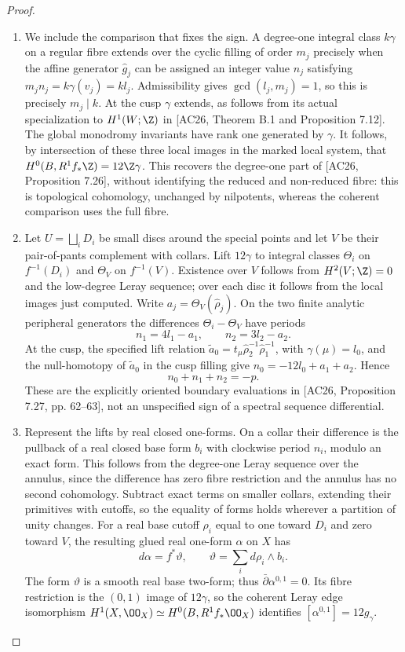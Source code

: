 \begin{proof}
\begin{enumerate}[label=\arabic*.,leftmargin=*]
\item We include the comparison that fixes the sign.  A degree-one integral
class $k\gamma$ on a regular fibre extends over the cyclic filling of
order $m_j$ precisely when the affine generator $\hat g_j$ can be
assigned an integer value $n_j$ satisfying
$m_j n_j=k\gamma(v_j)=kl_j$.  Admissibility gives
$\gcd(l_j,m_j)=1$, so this is precisely $m_j\mid k$.
At the cusp $\gamma$ extends, as follows from its actual specialization
to $H^1(W;\Z)$ in [AC26, Theorem B.1 and Proposition 7.12].
The global monodromy invariants have rank one generated by $\gamma$.
It follows, by intersection of these three local images in the marked
local system, that
$H^0(B,R^1f_*\Z)=12\Z\gamma$.  This recovers the degree-one
part of [AC26, Proposition 7.26], without identifying the reduced and
non-reduced fibre: this is topological cohomology, unchanged by
nilpotents, whereas the coherent comparison uses the full fibre.

\item Let $U=\bigsqcup_iD_i$ be small discs around the special points and
let $V$ be their pair-of-pants complement with collars.  Lift
$12\gamma$ to integral classes $\Theta_i$ on $f^{-1}(D_i)$ and
$\Theta_V$ on $f^{-1}(V)$.  Existence over $V$ follows from
$H^2(V;\Z)=0$ and the low-degree Leray sequence; over each disc it
follows from the local images just computed.  Write
$a_j=\Theta_V(\hat\rho_j)$.  On the two finite analytic peripheral generators
the differences $\Theta_i-\Theta_V$ have periods
\[
n_1=4l_1-a_1,\qquad n_2=3l_2-a_2.
\]
At the cusp, the specified lift relation
$\widetilde a_0=t_\mu\hat\rho_2^{-1}\hat\rho_1^{-1}$,
with $\gamma(\mu)=l_0$, and the null-homotopy of
$\widetilde a_0$ in the cusp filling give
$n_0=-12l_0+a_1+a_2$.  Hence
\begin{equation}\label{inv:eq:C-collar-sum}
n_0+n_1+n_2=-p.
\end{equation}
These are the explicitly oriented boundary evaluations in [AC26,
Proposition 7.27, pp. 62--63], not an unspecified sign of a spectral
sequence differential.

\item Represent the lifts by real closed one-forms.  On a collar their
difference is the pullback of a real closed base form $b_i$ with
clockwise period $n_i$, modulo an exact form.  This follows from the
degree-one Leray sequence over the annulus, since the difference has
zero fibre restriction and the annulus has no second cohomology.
Subtract exact terms on smaller collars, extending their primitives
with cutoffs, so the equality of forms holds wherever a partition of
unity changes.  For a real base cutoff $\rho_i$ equal to one toward
$D_i$ and zero toward $V$, the resulting glued real one-form $\alpha$
on $X$ has
\[
d\alpha=f^*\vartheta,\qquad
\vartheta=\sum_i d\rho_i\wedge b_i.
\]
The form $\vartheta$ is a smooth real base two-form; thus
$\bar\partial\alpha^{0,1}=0$.  Its fibre restriction is the
$(0,1)$ image of $12\gamma$, so the coherent Leray edge isomorphism
$H^1(X,\OO_X)\simeq H^0(B,R^1f_*\OO_X)$ identifies
$[\alpha^{0,1}]=12g_\gamma$.


\end{enumerate}
\end{proof}
